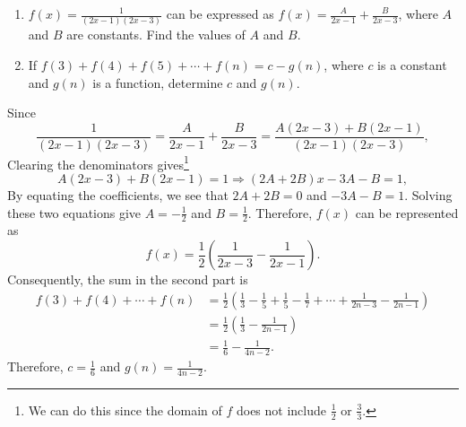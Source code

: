 \begin{question}
    \begin{enumerate}
        \item $f(x) = \frac{1}{(2x - 1)(2x - 3)}$ can be expressed as $f(x) =
            \frac{A}{2x - 1}+\frac{B}{2x - 3}$, where $A$ and $B$ are
            constants. Find the values of $A$ and $B$. 
        
        \item If $f(3) + f(4) + f(5) + \cdots + f(n) = c - g(n)$, where $c$ is
            a constant and $g(n)$ is a function, determine $c$ and $g(n)$. 
    \end{enumerate}
\end{question}
\begin{solution}
    Since 
    \[ \frac{1}{(2x - 1)(2x - 3)} = \frac{A}{2x - 1} + \frac{B}{2x - 3} =
    \frac{A(2x - 3) + B(2x - 1)}{(2x - 1)(2x - 3)}, \]
    Clearing the denominators gives\footnote{We can do this since the domain of
    $f$ does not include $\frac{1}{2}$ or $\frac{3}{3}$.}
    \[ A(2x - 3) + B(2x - 1) = 1 \Longrightarrow (2A + 2B)x - 3A - B = 1, \]
    By equating the coefficients, we see that $2A + 2B = 0$ and $-3A - B = 1$.
    Solving these two equations give $A = -\frac{1}{2}$ and $B = \frac{1}{2}$.
    Therefore, $f(x)$ can be represented as
    \[ f(x) = \frac{1}{2}\left( \frac{1}{2x - 3} - \frac{1}{2x - 1} \right). \]
    Consequently, the sum in the second part is
    \begin{align*}
        f(3) + f(4) + \cdots + f(n)
        &= \frac{1}{2}\left( \frac{1}{3} - \frac{1}{5} + \frac{1}{5} - \frac{1}{7} + \cdots + \frac{1}{2n - 3} - \frac{1}{2n - 1} \right)\\
        &= \frac{1}{2}\left( \frac{1}{3} - \frac{1}{2n - 1} \right)\\
        &= \frac{1}{6} - \frac{1}{4n - 2}.
    \end{align*}
    Therefore, $c = \frac{1}{6}$ and $g(n) = \frac{1}{4n - 2}$.
\end{solution}

